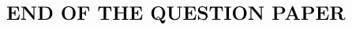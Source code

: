 \documentclass[journal,12pt,onecolumn]{IEEEtran}
\begin{document}
\begin{enumerate}
\hfill{}








\end{enumerate}

\begin{align*}
 {\LARGE{\textbf{END OF THE QUESTION PAPER}}}
\end{align*}
\end{document}

